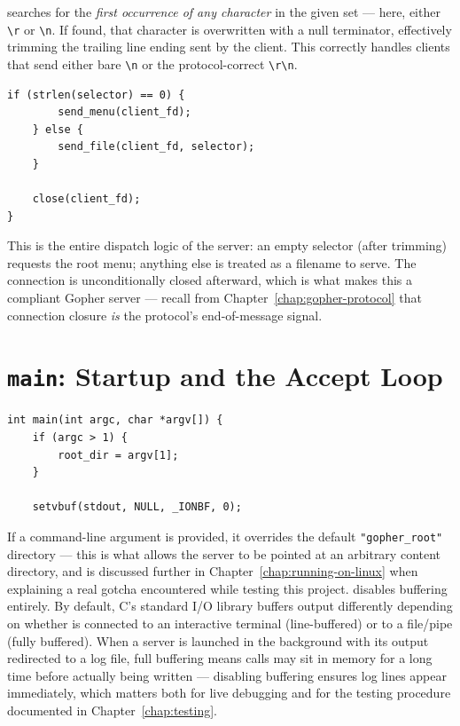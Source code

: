  searches  for the \emph{first occurrence of any character} in the given set --- here, either \texttt{\textbackslash r} or \texttt{\textbackslash n}. If found, that character is overwritten with a null terminator, effectively trimming the trailing line ending sent by the client. This correctly handles clients that send either bare \texttt{\textbackslash n} or the protocol-correct \texttt{\textbackslash r\textbackslash n}.

\begin{lstlisting}[style=cstyle]
    if (strlen(selector) == 0) {
        send_menu(client_fd);
    } else {
        send_file(client_fd, selector);
    }

    close(client_fd);
}
\end{lstlisting}

This is the entire dispatch logic of the server: an empty selector (after trimming) requests the root menu; anything else is treated as a filename to serve. The connection is unconditionally closed afterward, which is what makes this a compliant Gopher server --- recall from Chapter~\ref{chap:gopher-protocol} that connection closure \emph{is} the protocol's end-of-message signal.

\section{\texttt{main}: Startup and the Accept Loop}

\begin{lstlisting}[style=cstyle]
int main(int argc, char *argv[]) {
    if (argc > 1) {
        root_dir = argv[1];
    }

    setvbuf(stdout, NULL, _IONBF, 0);
\end{lstlisting}

If a command-line argument is provided, it overrides the default \texttt{"gopher\_root"} directory --- this is what allows the server to be pointed at an arbitrary content directory, and is discussed further in Chapter~\ref{chap:running-on-linux} when explaining a real gotcha encountered while testing this project.  disables  buffering entirely. By default, C's standard I/O library buffers output differently depending on whether  is connected to an interactive terminal (line-buffered) or to a file/pipe (fully buffered). When a server is launched in the background with its output redirected to a log file, full buffering means  calls may sit in memory for a long time before actually being written --- disabling buffering ensures log lines appear immediately, which matters both for live debugging and for the testing procedure documented in Chapter~\ref{chap:testing}.

